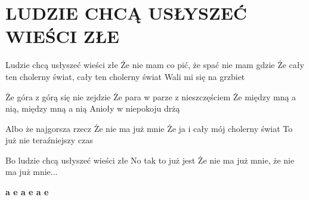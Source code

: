 \documentclass[../../../songbook.tex]{subfiles}
\begin{document}
\TabPositions{8cm} %
\section*{LUDZIE CHCĄ USŁYSZEĆ WIEŚCI ZŁE}
{}
\vspace{0.5cm}
Ludzie chcą usłyszeć wieści złe							 \newline
Że nie mam co pić, że spać nie mam gdzie				 \newline
Że cały ten cholerny świat, cały ten cholerny świat		 \newline
Wali mi się na grzbiet									 \newline

Że góra z górą się nie zejdzie				\newline
Że para w parze z nieszczęściem 				\newline
Że między mną a nią, między mną a nią 				\newline
Anioły w niepokoju drżą					\newline
	
Albo że najgorsza rzecz						\newline
Że nie ma już mnie						\newline
Że ja i cały mój cholerny świat					\newline 
To już nie teraźniejszy czas					\newline	

Bo ludzie chcą usłyszeć wieści złe			 \newline
No tak to już jest							 \newline 
Że nie ma już mnie, że nie ma już mnie...	 \newline

{\color{red}\textbf{a e a e a e} } \newline
\end{document}
